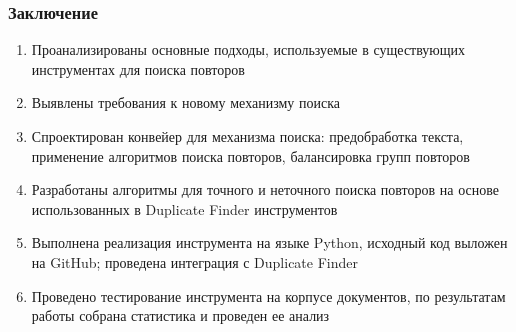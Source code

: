 \documentclass[aspectratio43]{beamer}
\begin{document}

\begin{frame}\frametitle{Заключение}
	
	\begin{enumerate}
		\item Проанализированы основные подходы, используемые в существующих инструментах для поиска повторов
		\item Выявлены требования к новому механизму поиска
		\item Спроектирован конвейер для механизма поиска: предобработка текста, применение алгоритмов поиска повторов, балансировка групп повторов
		\item Разработаны алгоритмы для точного и неточного поиска повторов на основе использованных в Duplicate Finder инструментов
		\item Выполнена реализация инструмента на языке Python, исходный код выложен на GitHub; проведена интеграция с Duplicate Finder
		\item Проведено тестирование инструмента на корпусе документов, по результатам работы собрана статистика и проведен ее анализ
	\end{enumerate}

\end{frame}

\end{document}
